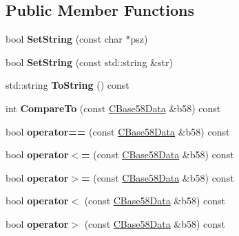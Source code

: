 \subsection*{Public Member Functions}
\begin{DoxyCompactItemize}
\item 
\mbox{\label{class_c_base58_data_ab32e6bf3d44fead40feed92670a4716f}} 
bool {\bfseries Set\+String} (const char $\ast$psz)
\item 
\mbox{\label{class_c_base58_data_a8e0cba75a3e0a5b21defaf1471d8659c}} 
bool {\bfseries Set\+String} (const std\+::string \&str)
\item 
\mbox{\label{class_c_base58_data_a7dc91af403ca02694b3247b15604e220}} 
std\+::string {\bfseries To\+String} () const
\item 
\mbox{\label{class_c_base58_data_ad89d6bd7afa8d831dffce12803c5f58d}} 
int {\bfseries Compare\+To} (const \mbox{\hyperlink{class_c_base58_data}{C\+Base58\+Data}} \&b58) const
\item 
\mbox{\label{class_c_base58_data_a2e7a634c3a008adf3f74d72ed9dbd68c}} 
bool {\bfseries operator==} (const \mbox{\hyperlink{class_c_base58_data}{C\+Base58\+Data}} \&b58) const
\item 
\mbox{\label{class_c_base58_data_a1d99c2d0a82cbe648ba2a99e41386486}} 
bool {\bfseries operator$<$=} (const \mbox{\hyperlink{class_c_base58_data}{C\+Base58\+Data}} \&b58) const
\item 
\mbox{\label{class_c_base58_data_a0cac1805398e2b09a498ba884c7a0057}} 
bool {\bfseries operator$>$=} (const \mbox{\hyperlink{class_c_base58_data}{C\+Base58\+Data}} \&b58) const
\item 
\mbox{\label{class_c_base58_data_a7377c5628c43551ca22af1c0dfbaebae}} 
bool {\bfseries operator$<$} (const \mbox{\hyperlink{class_c_base58_data}{C\+Base58\+Data}} \&b58) const
\item 
\mbox{\label{class_c_base58_data_a7d8052eacc8de55a0f4ec91306dfbec3}} 
bool {\bfseries operator$>$} (const \mbox{\hyperlink{class_c_base58_data}{C\+Base58\+Data}} \&b58) const
\end{DoxyCompactItemize}
